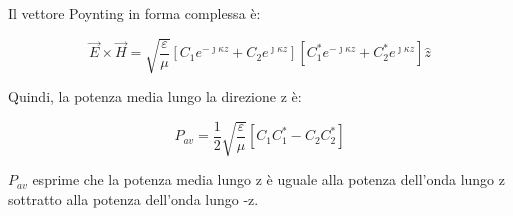 Il vettore Poynting in forma complessa è: 

{\Large \begin{equation}
    \vec{E} \times \vec{H} = \sqrt{\frac{\varepsilon}{\mu}} [C_1 e^{-\jmath \kappa z} + C_2 e^{\jmath \kappa z}] [C_1^{*} e^{-\jmath \kappa z} + C_2^{*} e^{\jmath \kappa z}] \hat{z}
\end{equation}}

Quindi, la potenza media lungo la direzione z è: 

{\Large \begin{equation}
    P_{av} = \frac{1}{2} \sqrt{\frac{\varepsilon}{\mu}} [C_1 C_1^{*} - C_2 C_2^{*}]
\end{equation}}

$P_{av}$ esprime che la potenza media lungo z è uguale alla potenza dell'onda lungo z sottratto alla potenza 
dell'onda lungo -z. \\ \\ 

\newpage 

